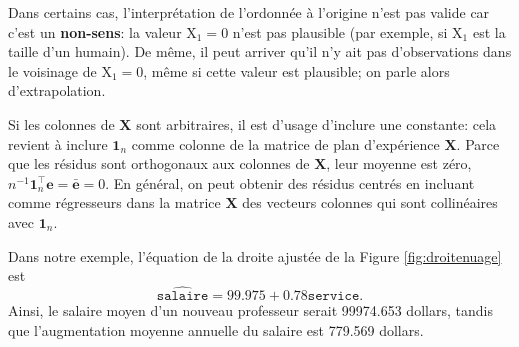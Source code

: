 \documentclass[
  11pt,
  letterpaper,
]{article}
\theoremstyle{definition}
\theoremstyle{definition}
\theoremstyle{definition}
\theoremstyle{definition}
\theoremstyle{remark}
\begin{document}
Dans certains cas, l'interprétation de l'ordonnée à l'origine n'est pas valide car c'est un \textbf{non-sens}: la valeur \(\mathrm{X}_1=0\) n'est pas plausible (par exemple, si \(\mathrm{X}_1\) est la taille d'un humain). De même, il peut arriver qu'il n'y ait pas d'observations dans le voisinage de \(\mathrm{X}_1=0\), même si cette valeur est plausible; on parle alors d'extrapolation.

Si les colonnes de \(\mathbf{X}\) sont arbitraires, il est d'usage d'inclure une constante: cela revient à inclure \(\mathbf{1}_n\) comme colonne de la matrice de plan d'expérience \(\mathbf{X}\). Parce que les résidus sont orthogonaux aux colonnes de \(\mathbf{X}\), leur moyenne est zéro, \(n^{-1}\mathbf{1}_n^\top\boldsymbol{e}=\bar{\boldsymbol{e}}=0\). En général, on peut obtenir des résidus centrés en incluant comme régresseurs dans la matrice \(\mathbf{X}\) des vecteurs colonnes qui sont collinéaires avec \(\mathbf{1}_n\).

Dans notre exemple, l'équation de la droite ajustée de la Figure \ref{fig:droitenuage} est \[\widehat{\texttt{salaire}} = 99.975 + 0.78\texttt{service}.\]
Ainsi, le salaire moyen d'un nouveau professeur serait 99974.653 dollars, tandis que l'augmentation moyenne annuelle du salaire est 779.569 dollars.
\end{document}

